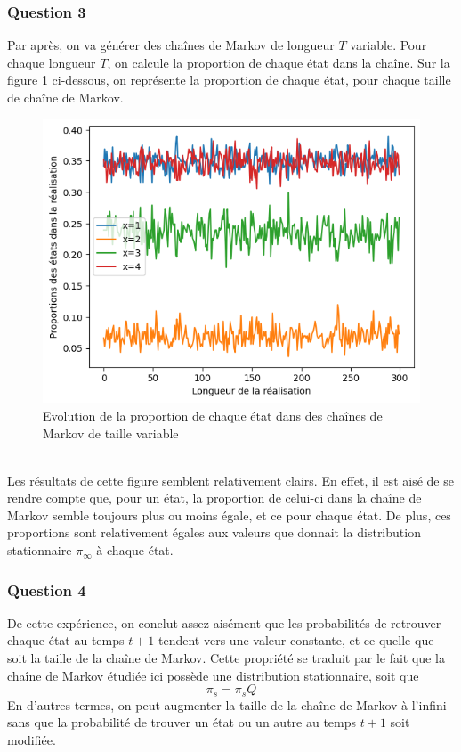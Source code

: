 \documentclass[a4paper, 11pt]{article}
\begin{document}
\subsubsection{Question 3}
Par après, on va générer des chaînes de Markov de longueur $T$ variable. Pour chaque longueur $T$, on calcule la proportion de chaque état dans la chaîne. Sur la figure \ref{fig:evol_prop} ci-dessous, on représente la proportion de chaque état, pour chaque taille de chaîne de Markov.
\begin{figure}[h!]
    \centering
    \includegraphics[scale=1]{evol_states.png}
    \caption{Evolution de la proportion de chaque état dans des chaînes de Markov de taille variable}
    \label{fig:evol_prop}
\end{figure}\\

Les résultats de cette figure semblent relativement clairs. En effet, il est aisé de se rendre compte que, pour un état, la proportion de celui-ci dans la chaîne de Markov semble toujours plus ou moins égale, et ce pour chaque état. De plus, ces proportions sont relativement égales aux valeurs que donnait la distribution stationnaire $\pi_\infty$ à chaque état.
\subsubsection{Question 4}
De cette expérience, on conclut assez aisément que les probabilités de retrouver chaque état au temps $t+1$ tendent vers une valeur constante, et ce quelle que soit la taille de la chaîne de Markov. Cette propriété se traduit par le fait que la chaîne de Markov étudiée ici possède une distribution stationnaire, soit que 
$$\pi_s=\pi_s Q$$
En d'autres termes, on peut augmenter la taille de la chaîne de Markov à l'infini sans que la probabilité de trouver un état ou un autre au temps $t+1$ soit modifiée. 
\newpage
\end{document}
